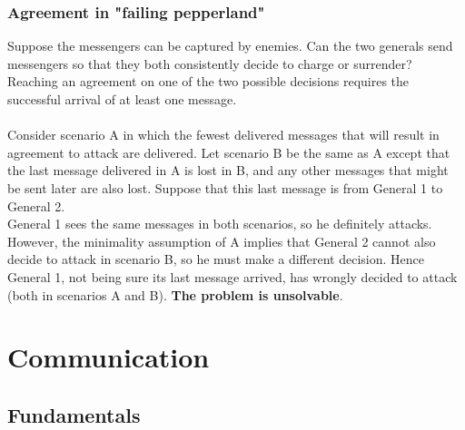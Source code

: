 \documentclass[10pt,a4paper]{article}
\begin{document}
\subsubsection{Agreement in "failing pepperland"}
Suppose the messengers can be captured by enemies. Can the two generals send messengers so that they both consistently decide to charge or surrender? \\
Reaching an agreement on one of the two possible decisions requires the successful arrival of at least one message. \\ \\ Consider scenario A in which the fewest delivered messages that will result in agreement to attack are delivered. Let scenario B be the same as A except that the last message delivered in A is lost in B, and any other messages that might be sent later are also lost. Suppose that this last message is from General 1 to General 2. \\ General 1 sees the same messages in both scenarios, so he definitely attacks. However, the minimality assumption of A implies that General 2 cannot also decide to attack in scenario B, so he must make a different decision. Hence General 1, not being sure its last message arrived, has wrongly decided to attack (both in scenarios A and B). \textbf{The problem is unsolvable}.
\pagebreak
\section{\LARGE Communication}
\subsection{Fundamentals}
\end{document}
